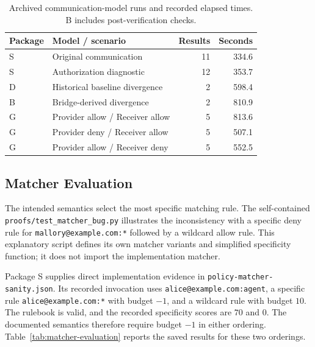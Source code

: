 \begin{table}[htbp]
\centering
\small
\begin{tabular}{llrr}
\hline
Package & Model / scenario & Results & Seconds \\
\hline
S & Original communication & 11 & 334.6 \\
S & Authorization diagnostic & 12 & 353.7 \\
D & Historical baseline divergence & 2 & 598.4 \\
B & Bridge-derived divergence & 2 & 810.9 \\
G & Provider allow / Receiver allow & 5 & 813.6 \\
G & Provider deny / Receiver allow & 5 & 507.1 \\
G & Provider allow / Receiver deny & 5 & 552.5 \\
\hline
\end{tabular}
\caption{Archived communication-model runs and recorded elapsed times.
B includes post-verification checks.}
\label{tab:evaluation-runs}
\end{table}


\subsection{Matcher Evaluation}

The intended semantics select the most specific matching rule. The
self-contained \texttt{proofs/test\_matcher\_bug.py} illustrates the
inconsistency with a specific deny rule for
\texttt{mallory@example.com:*} followed by a wildcard allow rule.
This explanatory script defines its own matcher variants and simplified
specificity function; it does not import the implementation matcher.

Package S supplies direct implementation evidence in
\texttt{policy-\allowbreak matcher-\allowbreak sanity.json}.
Its recorded invocation uses
\texttt{alice@example.com:agent}, a specific rule
\texttt{alice@example.com:*} with budget $-1$, and a wildcard rule with
budget $10$. The rulebook is valid, and the recorded specificity scores
are $70$ and $0$. The documented semantics therefore require budget $-1$
in either ordering. Table~\ref{tab:matcher-evaluation} reports the saved
results for these two orderings.

